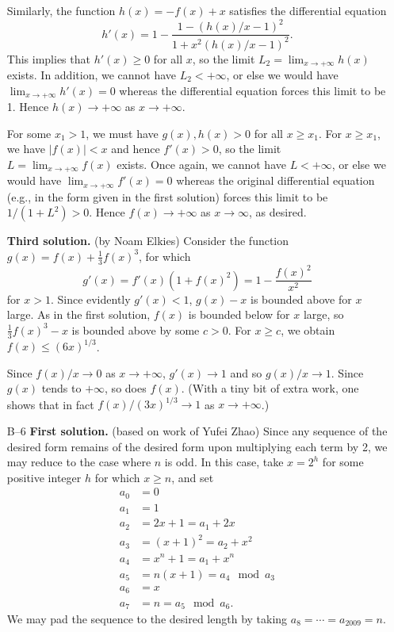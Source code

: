 \documentclass[amssymb,twocolumn,pra,10pt,aps]{revtex4-1}
\begin{document}
\begin{itemize}
Similarly, the function $h(x) = -f(x) + x$ satisfies the differential equation
\[
h'(x) = 1 - \frac{1 - (h(x)/x - 1)^2}{1 + x^2(h(x)/x - 1)^2}.
\]
This implies that $h'(x) \geq 0$ for all $x$,
so the limit $L_2 = \lim_{x \to +\infty} h(x)$ exists. In addition, we cannot have
$L_2 < +\infty$, or else we would have
$\lim_{x \to +\infty} h'(x) = 0$ whereas the differential equation forces
this limit to be 1.
Hence $h(x) \to +\infty$ as $x \to +\infty$.

For some $x_1 > 1$, we must have $g(x), h(x) > 0$ for all $x \geq x_1$. For
$x \geq x_1$, we have $|f(x)| < x$ and hence $f'(x) > 0$, so the limit
$L = \lim_{x \to +\infty} f(x)$ exists. Once again,
we cannot have $L < +\infty$, or else we would have
$\lim_{x \to +\infty} f'(x) = 0$ whereas the original differential equation (e.g., in the form
given in the first solution) forces
this limit to be $1/(1 + L^2) > 0$.
Hence $f(x) \to +\infty$ as $x \to \infty$, as desired.

\textbf{Third solution.}
(by Noam Elkies)
Consider the function $g(x) = f(x) + \frac{1}{3}f(x)^3$, for which
\[
 g'(x) = f'(x)(1 + f(x)^2) = 1 - \frac{f(x)^2}{x^2}
\]
for $x>1$. Since evidently $g'(x) < 1$,
$g(x) - x$ is bounded above for $x$ large.
As in the first solution,
$f(x)$ is bounded below for $x$ large,
so $\frac{1}{3} f(x)^3 - x$ is bounded above by some $c>0$. For $x \geq c$,
we obtain $f(x) \leq (6x)^{1/3}$.

Since $f(x)/x \to 0$ as $x \to +\infty$, $g'(x) \to 1$ and so
$g(x)/x \to 1$. Since $g(x)$ tends to $+\infty$,
so does $f(x)$. (With a tiny bit of extra work, one shows that in fact $f(x)/(3x)^{1/3} \to 1$ as $x \to +\infty$.)

\item[B--6]
\textbf{First solution.}
(based on work of Yufei Zhao)
Since any sequence of the desired form remains of the desired form upon multiplying each term by 2,
we may reduce to the case where $n$ is odd. In this case, take $x = 2^h$ for some
positive integer $h$ for which $x \geq n$, and set
\begin{align*}
a_0 &= 0\\
a_1 &= 1\\
a_2 &= 2x+1 = a_1 + 2x \\
a_3 &= (x+1)^2 = a_2 + x^2 \\
a_4 &= x^n+1 = a_1 + x^n\\
a_5 &= n(x+1) = a_4 \mod a_3\\
a_6 &= x \\
a_7 &= n = a_5 \mod a_6.
\end{align*}
We may pad the sequence to the desired length by taking
$a_8 = \cdots = a_{2009} = n$.


\end{itemize}
\end{document}
